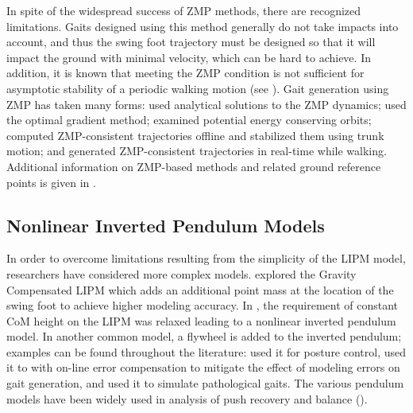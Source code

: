 In spite of the widespread success of ZMP methods, there are recognized limitations.
%
Gaits designed using this method generally do not take impacts into account, and thus the swing foot trajectory must be designed so that it will impact the ground with minimal velocity, which can be hard to achieve.
%
In addition, it is known that meeting the ZMP condition is not sufficient for asymptotic stability of a periodic walking motion (see \cite{Choi2005}).
%
Gait generation using ZMP has taken many forms:
%
\cite{Kurazume2003} used analytical solutions to the ZMP dynamics; \cite{Nagasaka1999} used the optimal gradient method;
%
\cite{Kajita1992} examined potential energy conserving orbits; \cite{Lim2002} computed ZMP-consistent trajectories offline and stabilized them using trunk motion;
%
and \cite{Nishiwaki2002} generated ZMP-consistent trajectories in real-time while walking.
%
Additional information on ZMP-based methods and related ground reference points is given in \cite{Goswami1999,Vukobratovic2004,Vukobratovic2006,Popovic2005}.

%

\subsection{Nonlinear Inverted Pendulum Models}

In order to overcome limitations resulting from the simplicity of the LIPM model, researchers have considered more complex models.
%
\cite{Park1998} explored the Gravity Compensated LIPM which adds an additional point mass at the location of the swing foot to achieve higher modeling accuracy.
%
In \cite{Pratt2007}, the requirement of constant CoM height on the LIPM was relaxed leading to a nonlinear inverted pendulum model.
%
In another common model, a flywheel is added to the inverted pendulum;
%
examples can be found throughout the literature:
%
\cite{Stephens2011} used it for posture control,
%
\cite{Takenaka2009} used it to with on-line error compensation to mitigate the effect of modeling errors on gait generation,
%
and \cite{Komura2005} used it to simulate pathological gaits.
%
The various pendulum models have been widely used in analysis of push recovery and balance (\cite{Takanishi1990,Hof2005,Hyon2007,Stephens2007}).



